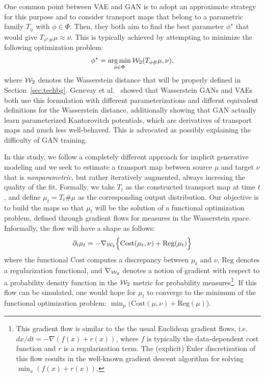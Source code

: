 One common point between VAE and GAN is to adopt an approximate strategy for this purpose and to consider transport maps that belong to a parametric family $T_{\phi}$ with $\phi \in \Phi$. Then, they both aim to find the best parameter $\phi^\star$ that would give $T_{\phi^\star \#}\mu \approx \nu$. This is typically achieved by attempting to minimize the following optimization problem:
\begin{align}
\phi^\star = \operatorname*{arg\min}_{\phi \in \Phi} {\cal W}_2(T_{\phi \#}\mu, \nu),
\end{align}
where ${\cal W}_2$ denotes the Wasserstein distance that will be properly defined in Section~\ref{sec:techbg}. Genevay et al.\ \cite{genevay2017gan} showed that Wasserstein GANs and VAEs both use this formulation with different parameterizations and differnt equivalent definitions for the Wasserstein distance, additionally showing that GAN actually learn parameterized Kantorovitch potentials, which are derivatives of transport maps and much less well-behaved. This is advocated as possibly explaining the difficulty of GAN training.

In this study, we follow a completely different approach for implicit generative modeling and we seek to estimate a transport map between source $\mu$ and target $\nu$ that is \textit{nonparametric}, but rather iteratively augmented, always incresing the quality of the fit. Formally, we take $T_t$ as the constructed transport map at time $t$, and define $\mu_t=T_t \# \mu$ as the corresponding output distribution. Our objective is to build the maps so that $\mu_t$ will be the solution of a functional optimization problem, defined through gradient flows for measures in the Wasserstein space. Informally, the flow will have a shape as follows:
\begin{align}
\partial_t \mu_t = - \nabla_{{\cal W}_2} \Bigl\{ \mathrm{Cost}(\mu_t, \nu) + \mathrm{Reg}(\mu_t)\Bigr\} \label{eqn:gradflow}
\end{align}
where the functional $\mathrm{Cost}$ computes a discrepancy between $\mu_t$ and $\nu$, $\mathrm{Reg}$ denotes a regularization functional, and $\nabla_{{\cal W}_2}$ denotes a notion of gradient with respect to a probability density function in the ${\cal W}_2$ metric for probability measures\footnote{This gradient flow is similar to the the usual Euclidean gradient flows, i.e.\ $dx/dt = - \nabla (f(x) + r(x))$, where $f$ is typically the data-dependent cost function and $r$ is a regularization term. The (explicit) Euler discretization of this flow results in the well-known gradient descent algorithm for solving $\min_x (f(x)+r(x))$.}. If this flow can be simulated, one would hope for $\mu_t$ to converge to the minimum of the functional optimization problem: $\min_\mu ( \mathrm{Cost}(\mu, \nu) + \mathrm{Reg}(\mu)$).

